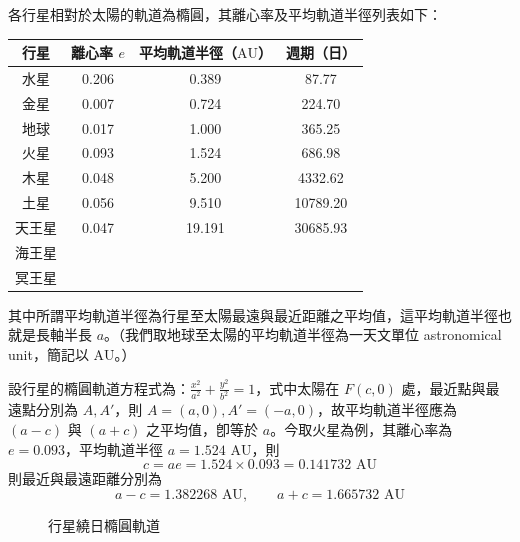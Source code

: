 \begin{example}
各行星相對於太陽的軌道為橢圓，其離心率及平均軌道半徑列表如下：
\begin{center}
\begin{tabular}{|c|c|c|c|}
\hline
行星 & 離心率 $e$ & 平均軌道半徑（$\text{AU}$） & 週期（日） \\ \hline
水星 & 0.206 & 0.389 & 87.77 \\ \hline
金星 & 0.007 & 0.724 & 224.70 \\ \hline
地球 & 0.017 & 1.000 & 365.25 \\ \hline
火星 & 0.093 & 1.524 & 686.98 \\ \hline
木星 & 0.048 & 5.200 & 4332.62 \\ \hline
土星 & 0.056 & 9.510 & 10789.20 \\ \hline
天王星 & 0.047 & 19.191 & 30685.93 \\ \hline
海王星 & & & \\ \hline
冥王星 & & & \\ \hline
\end{tabular}
\end{center}
其中所謂平均軌道半徑為行星至太陽最遠與最近距離之平均值，這平均軌道半徑也就是長軸半長 $a$。（我們取地球至太陽的平均軌道半徑為一天文單位 astronomical unit，簡記以 $\text{AU}$。）

設行星的橢圓軌道方程式為：$\frac{x^2}{a^2} + \frac{y^2}{b^2} = 1$，式中太陽在 $F(c,0)$ 處，最近點與最遠點分別為 $A, A'$，則 $A=(a,0), A'=(-a,0)$，故平均軌道半徑應為 $(a-c)$ 與 $(a+c)$ 之平均值，卽等於 $a$。今取火星為例，其離心率為 $e = 0.093$，平均軌道半徑 $a = 1.524\text{ AU}$，則
\[ c = ae = 1.524 \times 0.093 = 0.141732\text{ AU} \]
則最近與最遠距離分別為
\[ a - c = 1.382268\text{ AU}, \qquad a + c = 1.665732\text{ AU} \]

\begin{figure}[htbp]
\centering
{}
\caption{行星繞日橢圓軌道}
\label{fig:b4s-3-7}
\end{figure}
\end{example}

